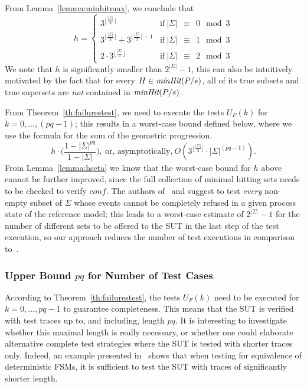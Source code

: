 %
From Lemma~\ref{lemma:minhitmax}, we conclude that
$$h=\begin{cases}
3^{\lfloor\frac{|\Sigma|}{3}\rfloor} &\text{if}\  |\Sigma|~~\equiv~~0 \mod 3\\
3^{\lfloor\frac{|\Sigma|}{3}\rfloor}  + 3^{\lfloor\frac{|\Sigma|}{3}\rfloor-1}&\text{if}\ |\Sigma|~~\equiv~~1\mod 3\\
2\cdot 3^{\lfloor\frac{|\Sigma|}{3}\rfloor} &\text{if}\ |\Sigma|~~\equiv~~2 \mod 3
\end{cases}
$$
%
We note that $h$ is significantly smaller than $2^{|\Sigma|}-1$, this can
also be intuitively motivated by the fact that  for every $H\in
\text{\it minHit}(P/s)$, all of its true subsets and true supersets are {\it not}
contained in $\text{\it minHit}(P/s)$.

From Theorem~\ref{th:failurestest}, we need to execute the tests $U_F(k)$ for
$k = 0,\dots,(pq-1)$; this results in a worst-case bound defined below, where
we use the formula for the sum of the geometric progression.
%
\[
h\cdot \big( \frac{1-|\Sigma|^{pq}}{1-|\Sigma|} \big),\
 \text{or, asymptotically,}\  O(3^{\lfloor\frac{|\Sigma|}{3}\rfloor}\cdot|\Sigma|^{(pq-1)}).
 \]
%
From Lemma~\ref{lemma:hseta} we know that the worst-case bound for $h$
above cannot be further improved, since the full collection of minimal
hitting sets needs to be checked to verify $conf$. The
authors of~\cite{Hennessy:1988:ATP:50497} and
\cite{DBLP:conf/icfem/CavalcantiG07} suggest to test {\it every} non-empty
subset of $\Sigma$ whose events cannot be completely refused in a given
process state of the reference model; this leads to a worst-case estimate of
$2^{|\Sigma|}-1$ for the number of different sets to be offered to the SUT in
the last step of the test execution, so our approach reduces the number of
test executions in comparison
to~\cite{Hennessy:1988:ATP:50497,DBLP:conf/icfem/CavalcantiG07}.



\subsubsection*{Upper Bound $pq$ for Number of Test Cases}

According to Theorem~\ref{th:failurestest}, the tests $U_F(k)$ need to be executed for 
$k = 0,\dots,pq-1$ to guarantee completeness. This means that the SUT is verified 
with test traces up to, and including, length $pq$. It is interesting to  investigate
whether this maximal length is really necessary, or whether one could elaborate
alternative complete test strategies where the SUT is tested with shorter traces only. 
Indeed, an example  presented in~\cite[Exercise~5]{PeleskaHuangLectureNotesMBT} 
shows that when testing for equivalence of deterministic FSMs, it is sufficient to
test the SUT with traces of significantly shorter length.

